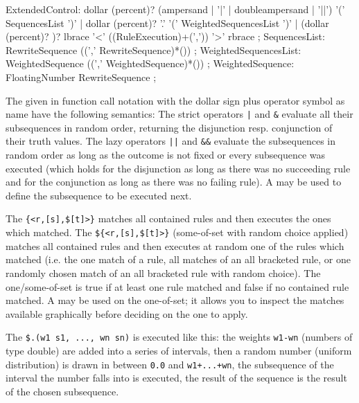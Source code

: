 \begin{rail} 
  ExtendedControl: 
	dollar (percent)? (ampersand | '|' | doubleampersand | '||') '(' SequencesList ')' |
	dollar (percent)? '.' '(' WeightedSequencesList ')' |
	(dollar (percent)? )? lbrace '<' ((RuleExecution)+(',')) '>' rbrace
	;
  SequencesList:
	RewriteSequence ((',' RewriteSequence)*())
	;
  WeightedSequencesList:
	WeightedSequence ((',' WeightedSequence)*())
	;
  WeightedSequence:
	FloatingNumber RewriteSequence
	;
\end{rail}

The  given in function call notation with the dollar sign plus operator symbol as name have the following semantics:
The strict operators \verb/|/ and \verb/&/ evaluate all their subsequences in random order, returning the disjunction resp. conjunction of their truth values.
The lazy operators \verb/||/ and \verb/&&/ evaluate the subsequences in random order as long as the outcome is not fixed or every subsequence was executed 
(which holds for the disjunction as long as there was no succeeding rule and for the conjunction as long as there was no failing rule).
A  may be used to define the subsequence to be executed next.

The  \verb/{<r,[s],$[t]>}/ matches all contained rules and then executes the ones which matched.
The  \verb/${<r,[s],$[t]>}/ (some-of-set with random choice applied) matches all contained rules and then executes at random one of the rules which matched
(i.e. the one match of a rule, all matches of an all bracketed rule, or one randomly chosen match of an all bracketed rule with random choice).
The one/some-of-set is true if at least one rule matched and false if no contained rule matched.
A  may be used on the one-of-set; it allows you to inspect the matches available graphically before deciding on the one to apply. 

The  \verb/$.(w1 s1, ..., wn sn)/ is executed like this:
the weights \texttt{w1-wn} (numbers of type double) are added into a series of intervals,
then a random number (uniform distribution) is drawn in between \texttt{0.0} and \texttt{w1+...+wn},
the subsequence of the interval the number falls into is executed,
the result of the sequence is the result of the chosen subsequence.



